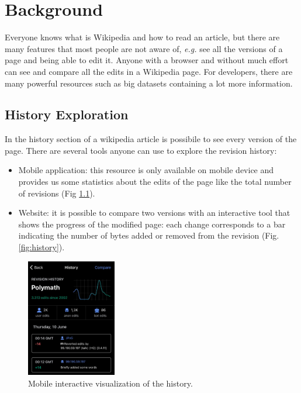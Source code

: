 \chapter{Background}
Everyone knows what is Wikipedia and how to read an article, but there are many features
that most people are not aware of, \textit{e.g.} see all the versions of a page and being able to edit it. 
Anyone with a browser and without much effort can see and compare all the edits in a
Wikipedia page. For developers, there are many powerful resources such as big datasets
containing a lot more information.  

\section{History Exploration}
In the history section of a wikipedia article is possibile to see every version of the page.
There are several tools anyone can use to explore the revision history: 


\begin{itemize}
    \item Mobile application: this resource is only available on mobile device and provides us
        some statistics about the edits of the page like the total number of revisions (Fig \ref{fig:mobilehistory}). 
    \item Website: it is possible to compare two versions with an interactive tool that shows
        the progress of the modified page: each change corresponds to a bar indicating the number of
        bytes added or removed from the revision (Fig. \ref{fig:history}).
\end{itemize}

\begin{figure}[H]
    \centering
    \includegraphics[width=0.35\textwidth]{./chapters/02/assets/mobile_history.jpg}
    \caption{Mobile interactive visualization of the history.}
    \label{fig:mobilehistory}
\end{figure}

